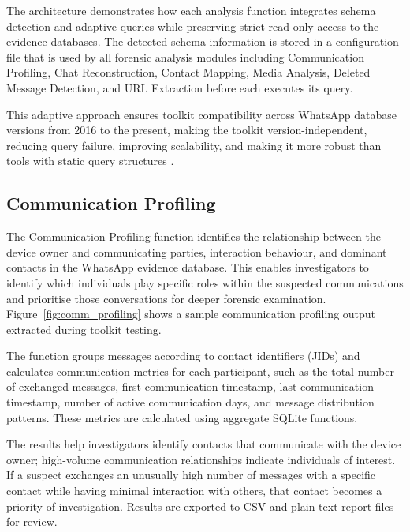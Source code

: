 \documentclass[12pt,a4paper]{report}
\begin{document}
The architecture demonstrates how each analysis function integrates schema detection and adaptive queries while preserving strict read-only access to the evidence databases. The detected schema information is stored in a configuration file that is used by all forensic analysis modules including Communication Profiling, Chat Reconstruction, Contact Mapping, Media Analysis, Deleted Message Detection, and URL Extraction before each executes its query.

This adaptive approach ensures toolkit compatibility across WhatsApp database versions from 2016 to the present, making the toolkit version-independent, reducing query failure, improving scalability, and making it more robust than tools with static query structures \citep{fayyad2022,lekhac2022book}.

\subsection{Communication Profiling}

The Communication Profiling function identifies the relationship between the device owner and communicating parties, interaction behaviour, and dominant contacts in the WhatsApp evidence database. This enables investigators to identify which individuals play specific roles within the suspected communications and prioritise those conversations for deeper forensic examination. Figure~\ref{fig:comm_profiling} shows a sample communication profiling output extracted during toolkit testing.

The function groups messages according to contact identifiers (JIDs) and calculates communication metrics for each participant, such as the total number of exchanged messages, first communication timestamp, last communication timestamp, number of active communication days, and message distribution patterns. These metrics are calculated using aggregate SQLite functions.

The results help investigators identify contacts that communicate with the device owner; high-volume communication relationships indicate individuals of interest. If a suspect exchanges an unusually high number of messages with a specific contact while having minimal interaction with others, that contact becomes a priority of investigation. Results are exported to CSV and plain-text report files for review.

\end{document}
